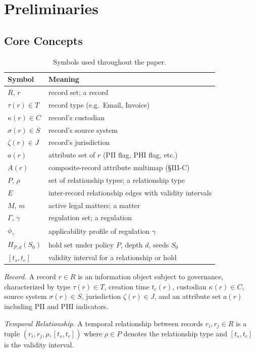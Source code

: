 \documentclass{ieeeaccess}
\begin{document}
\section{Preliminaries}

\subsection{Core Concepts}

\begin{table}[h]
\centering
\caption{Symbols used throughout the paper.}
\label{tab:symbols}
\small
\begin{tabular}{ll}
\hline\hline
Symbol & Meaning \\
\hline
$R$, $r$ & record set; a record \\
$\tau(r) \in T$ & record type (e.g.\ Email, Invoice) \\
$\kappa(r) \in C$ & record's custodian \\
$\sigma(r) \in S$ & record's source system \\
$\zeta(r) \in J$ & record's jurisdiction \\
$a(r)$ & attribute set of $r$ (PII flag, PHI flag, etc.) \\
$A(r)$ & composite-record attribute multimap (§III-C) \\
$P$, $\rho$ & set of relationship types; a relationship type \\
$E$ & inter-record relationship edges with validity intervals \\
$M$, $m$ & active legal matters; a matter \\
$\Gamma$, $\gamma$ & regulation set; a regulation \\
$\phi_\gamma$ & applicability profile of regulation $\gamma$ \\
$H_{P,d}(S_0)$ & hold set under policy $P$, depth $d$, seeds $S_0$ \\
$[t_s, t_e]$ & validity interval for a relationship or hold \\
\hline\hline
\end{tabular}
\end{table}

\textit{Record.} A record $r \in R$ is an information object subject to governance, characterized by type $\tau(r) \in T$, creation time $t_c(r)$, custodian $\kappa(r) \in C$, source system $\sigma(r) \in S$, jurisdiction $\zeta(r) \in J$, and an attribute set $a(r)$ including PII and PHI indicators.

\textit{Temporal Relationship.} A temporal relationship between records $r_i, r_j \in R$ is a tuple $(r_i, r_j, \rho, [t_s, t_e])$ where $\rho \in P$ denotes the relationship type and $[t_s, t_e]$ is the validity interval.
\end{document}
